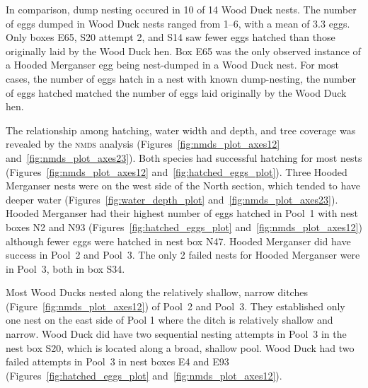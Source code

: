 In comparison, dump nesting occured in 10 of 14 Wood Duck nests. The number of eggs dumped in Wood Duck nests ranged from 1–6, with a mean of 3.3 eggs. Only boxes E65, S20 attempt 2, and S14 saw fewer eggs hatched than those originally laid by the Wood Duck hen. Box E65 was the only observed instance of a Hooded Merganser egg being nest-dumped in a Wood Duck nest. For most cases, the number of eggs hatch in a nest with known dump-nesting, the number of eggs hatched matched the number of eggs laid originally by the Wood Duck hen.


 


The relationship among hatching, water width and depth, and tree coverage was revealed by the \textsc{nmds} analysis (Figures~\ref{fig:nmds_plot_axes12} and~\ref{fig:nmds_plot_axes23}).  Both species had successful hatching for most nests (Figures~\ref{fig:nmds_plot_axes12} and~\ref{fig:hatched_eggs_plot}). Three Hooded Merganser nests were on the west side of the North section, which tended to have deeper water (Figures~\ref{fig:water_depth_plot} and~\ref{fig:nmds_plot_axes23}). Hooded Merganser had their highest number of eggs hatched in Pool~1 with nest boxes N2 and N93 (Figures~\ref{fig:hatched_eggs_plot} and~\ref{fig:nmds_plot_axes12}) although fewer eggs were hatched in nest box N47. Hooded Merganser did have success in Pool~2 and Pool~3. The only 2 failed nests for Hooded Merganser were in Pool~3, both in box S34. 

 

 

Most Wood Ducks nested along the relatively shallow, narrow ditches (Figure~\ref{fig:nmds_plot_axes12}) of Pool~2 and Pool~3. They established only one nest on the east side of Pool 1 where the ditch is relatively shallow and narrow. Wood Duck did have two sequential nesting attempts in Pool~3 in the nest box S20, which is located along a broad, shallow pool. Wood Duck had two failed attempts in Pool~3 in nest boxes E4 and E93 (Figures~\ref{fig:hatched_eggs_plot} and~\ref{fig:nmds_plot_axes12}). %



